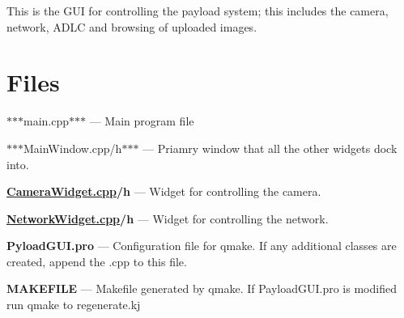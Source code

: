 This is the G\-U\-I for controlling the payload system; this includes the camera, network, A\-D\-L\-C and browsing of uploaded images.

\section*{Files }

$\ast$$\ast$$\ast$main.cpp$\ast$$\ast$$\ast$ --- Main program file

$\ast$$\ast$$\ast$\-Main\-Window.cpp/h$\ast$$\ast$$\ast$ --- Priamry window that all the other widgets dock into.

{\bfseries \hyperlink{CameraWidget_8cpp}{Camera\-Widget.\-cpp}/h} --- Widget for controlling the camera.

{\bfseries \hyperlink{NetworkWidget_8cpp}{Network\-Widget.\-cpp}/h} --- Widget for controlling the network.

{\bfseries Pyload\-G\-U\-I.\-pro} --- Configuration file for qmake. If any additional classes are created, append the .cpp to this file.

{\bfseries M\-A\-K\-E\-F\-I\-L\-E} --- Makefile generated by qmake. If Payload\-G\-U\-I.\-pro is modified run qmake to regenerate.\-kj 